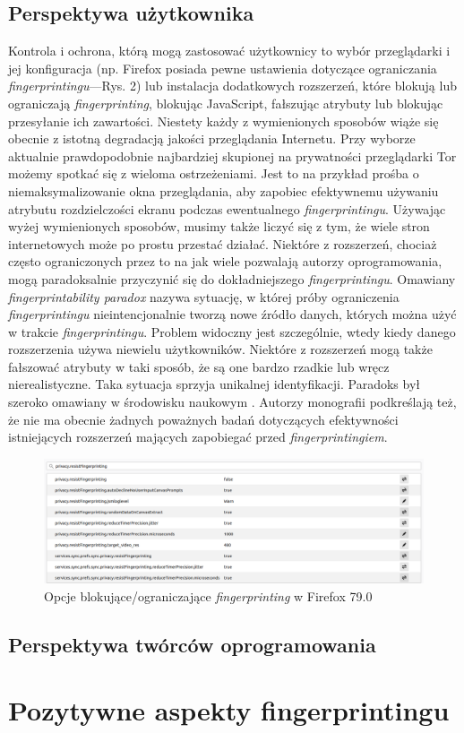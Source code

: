 \subsection{Perspektywa użytkownika}
Kontrola i ochrona, którą mogą zastosować użytkownicy to wybór przeglądarki i
jej konfiguracja (np. Firefox posiada pewne ustawienia dotyczące ograniczania
\emph{fingerprintingu}---Rys. 2) lub instalacja dodatkowych rozszerzeń, które
blokują lub ograniczają \emph{fingerprinting}, blokując JavaScript, fałszując
atrybuty lub blokując przesyłanie ich zawartości. Niestety każdy z wymienionych
sposobów wiąże się obecnie z istotną degradacją jakości przeglądania Internetu.
Przy wyborze aktualnie prawdopodobnie najbardziej skupionej na prywatności
przeglądarki Tor możemy spotkać się z wieloma ostrzeżeniami. Jest to na przykład
prośba o niemaksymalizowanie okna przeglądania, aby zapobiec efektywnemu
używaniu atrybutu rozdzielczości ekranu podczas ewentualnego
\emph{fingerprintingu}. Używając wyżej wymienionych sposobów, musimy także
liczyć się z tym, że wiele stron internetowych może po prostu przestać działać.
Niektóre z rozszerzeń, chociaż często ograniczonych przez to na jak wiele
pozwalają autorzy oprogramowania, mogą paradoksalnie przyczynić się do
dokładniejszego \emph{fingerprintingu}. Omawiany \emph{fingerprintability
	paradox} nazywa sytuację, w której próby ograniczenia \emph{fingerprintingu}
nieintencjonalnie tworzą nowe źródło danych, których można użyć w trakcie
\emph{fingerprintingu}. Problem widoczny jest szczególnie, wtedy kiedy danego
rozszerzenia używa niewielu użytkowników. Niektóre z rozszerzeń mogą także
fałszować atrybuty w taki sposób, że są one bardzo rzadkie lub wręcz
nierealistyczne. Taka sytuacja sprzyja unikalnej identyfikacji. Paradoks był
szeroko omawiany w środowisku naukowym \cite{eckersley2010unique,torres2015fp}.
Autorzy monografii podkreślają też, że nie ma obecnie żadnych poważnych badań
dotyczących efektywności istniejących rozszerzeń mających zapobiegać przed
\emph{fingerprintingiem}.

\begin{figure}
	\includegraphics[width=\textwidth,keepaspectratio]{img/02}
	\caption{Opcje blokujące/ograniczające \emph{fingerprinting} w Firefox 79.0}
\end{figure}

\subsection{Perspektywa twórców oprogramowania}

\section{Pozytywne aspekty fingerprintingu}
